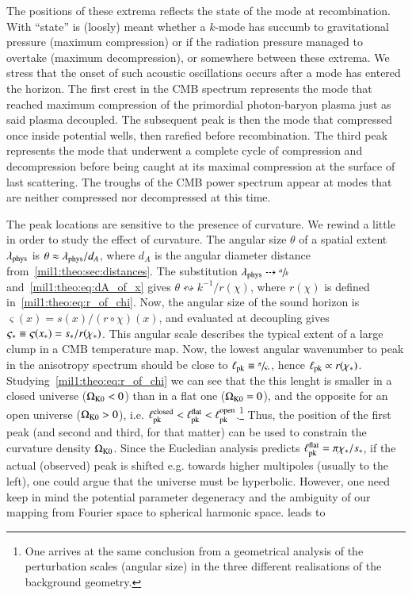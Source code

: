     The positions of these extrema reflects the state of the mode at recombination. With ``state'' is (loosly) meant whether a $k$-mode has succumb to gravitational pressure (maximum compression) or if the radiation pressure managed to overtake (maximum decompression), or somewhere between these extrema. We stress that the onset of such acoustic oscillations occurs after a mode has entered the horizon. The first crest in the CMB spectrum represents the mode that reached maximum compression of the primordial photon-baryon plasma just as said plasma decoupled. The subsequent peak is then the mode that compressed once inside potential wells, then rarefied before recombination. The third peak represents the mode that underwent a complete cycle of compression and decompression before being caught at its maximal compression at the surface of last scattering. The troughs of the CMB power spectrum appear at modes that are neither compressed nor decompressed at this time. 

    The peak locations are sensitive to the presence of curvature. We rewind a little in order to study the effect of curvature. The angular size $\theta$ of a spatial extent $\lambda_\mathrm{phys}$ is $\theta\approx\lambda_\mathrm{phys}/d_A$, where $d_A$ is the angular diameter distance from~\cref{mil1:theo:sec:distances}. The substitution $\lambda_\mathrm{phys}  \dashrightarrow \sfrac{a}{k}$ and~\cref{mil1:theo:eq:dA_of_x} gives $\theta \leftrightsquigarrow  k^{-1}/r(\chi) $, where $r(\chi)$ is defined in~\cref{mil1:theo:eq:r_of_chi}. Now, the angular size of the sound horizon is $\varsigma(x) = s(x)/(r\circ\chi )(x)$, and evaluated at decoupling gives $\varsigma_*\equiv \varsigma(x_*)=s_*/r(\chi_*)$. This angular scale describes the typical extent of a large clump in a CMB temperature map. Now, the lowest angular wavenumber to peak in the anisotropy spectrum should be close to $\ell_\mathrm{pk}\equiv \sfrac{\pi}{\varsigma_*}$, hence $\ell_\mathrm{pk}\propto r(\chi_*) $. Studying~\cref{mil1:theo:eq:r_of_chi} we can see that the this lenght is smaller in a closed universe ($\Omega_{\mathrm{K}0} < 0$) than in a flat one ($\Omega_{\mathrm{K}0} = 0$), and the opposite for an open universe ($\Omega_{\mathrm{K}0} > 0$), i.e. $\ell_\mathrm{pk}^\mathrm{closed}< \ell_\mathrm{pk}^\mathrm{flat}<\ell_\mathrm{pk}^\mathrm{open}$.\footnote{One arrives at the same conclusion from a geometrical analysis of the perturbation scales (angular size) in the three different realisations of the background geometry.} Thus, the position of the first peak (and second and third, for that matter) can be used to constrain the curvature density $\Omega_{\mathrm{K}0}$. Since the Eucledian analysis predicts $\ell_\mathrm{pk}^\mathrm{flat} = \pi \chi_*/s_*$, if the actual (observed) peak is shifted e.g. towards higher multipoles (usually to the left), one could argue that the universe must be hyperbolic. However, one need keep in mind the potential parameter degeneracy and the ambiguity of our mapping from Fourier space to spherical harmonic space. %
    leads to
    
